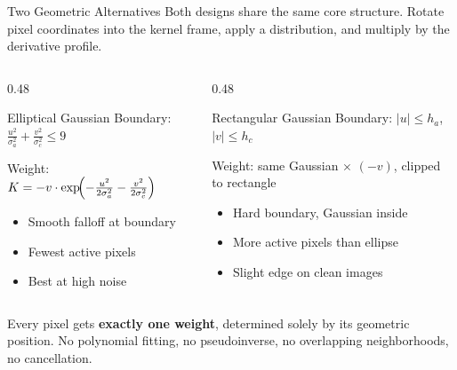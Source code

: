 \documentclass[10pt, aspectratio=169]{beamer}
\begin{document}
\begin{frame}{Two Geometric Alternatives}
  Both designs share the same core structure. Rotate pixel coordinates into the kernel frame, apply a distribution, and multiply by the derivative profile.

  \vspace{0.3em}
  \begin{columns}[T]
    \begin{column}{0.48\textwidth}
      \begin{block}{Elliptical Gaussian}
        Boundary: $\displaystyle\frac{u^2}{\sigma_a^2} + \frac{v^2}{\sigma_c^2} \leq 9$

        \vspace{0.3em}
        Weight: $K = -v \cdot \exp\!\Bigl(-\frac{u^2}{2\sigma_a^2} - \frac{v^2}{2\sigma_c^2}\Bigr)$

        \vspace{0.3em}
        \begin{itemize}
          \item Smooth falloff at boundary
          \item Fewest active pixels
          \item Best at high noise
        \end{itemize}
      \end{block}
    \end{column}
    \begin{column}{0.48\textwidth}
      \begin{block}{Rectangular Gaussian}
        Boundary: $|u| \leq h_a$, $|v| \leq h_c$

        \vspace{0.3em}
        Weight: same Gaussian $\times$ $(-v)$, clipped to rectangle

        \vspace{0.3em}
        \begin{itemize}
          \item Hard boundary, Gaussian inside
          \item More active pixels than ellipse
          \item Slight edge on clean images
        \end{itemize}
      \end{block}
    \end{column}
  \end{columns}

  \vspace{0.3em}
  {\small Every pixel gets \textbf{exactly one weight}, determined solely by its geometric position. No polynomial fitting, no pseudoinverse, no overlapping neighborhoods, no cancellation.}
\end{frame}
\end{document}
